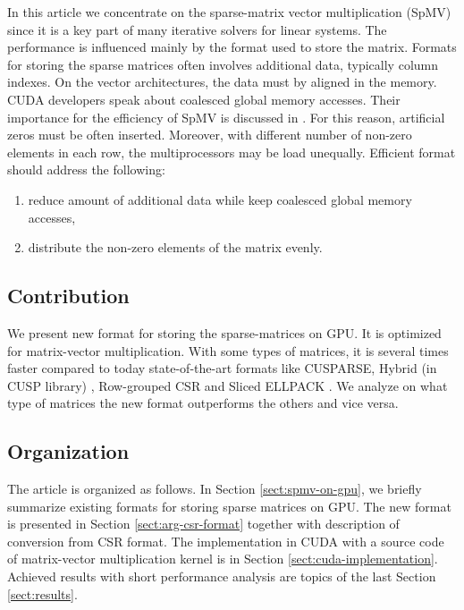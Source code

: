 \documentclass{pj}
\begin{document}
In this article we concentrate on the sparse-matrix vector multiplication (SpMV) since it is a key part of many iterative solvers for linear systems. 
The performance is influenced mainly by the format used to store the matrix. Formats for storing the sparse matrices often involves additional data, typically column indexes. On the vector architectures, the data must by aligned in the memory. CUDA developers speak about coalesced global memory accesses. Their importance for the efficiency of SpMV is discussed in \cite{BellGarland-2008,OberhuberSuzukiVacata-2011}. For this reason, artificial zeros must be often inserted. Moreover, with different number of non-zero elements in each row, the multiprocessors may be load unequally. Efficient format should address the following:

\begin{enumerate}
\item reduce amount of additional data while keep coalesced global memory accesses,
\item distribute the non-zero elements of the matrix evenly.
\end{enumerate}


\subsection{Contribution}
\label{sect:contribution}

We present new format for storing the sparse-matrices on GPU. It is optimized for matrix-vector multiplication. With some types of matrices, it is several times faster compared to today state-of-the-art formats like CUSPARSE, Hybrid (in CUSP library) \cite{BellGarland-2008}, Row-grouped CSR \cite{OberhuberSuzukiVacata-2011} and Sliced ELLPACK \cite{MonakovLokhmotovAvetisyan-2010}. We analyze on what type of matrices the new format outperforms the others and vice versa.

\subsection{Organization}
\label{sect:organisation}

The article is organized as follows. In Section \ref{sect:spmv-on-gpu}, we briefly summarize existing formats for storing sparse matrices on GPU. The new format is presented in Section \ref{sect:arg-csr-format} together with description of conversion from CSR format. The implementation in CUDA with a source code of matrix-vector multiplication kernel is in Section \ref{sect:cuda-implementation}. Achieved results with short performance analysis are topics of the last Section \ref{sect:results}.
\end{document}

